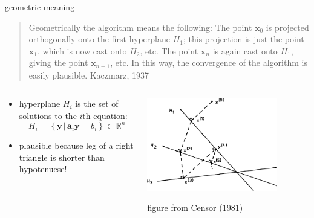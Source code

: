 \documentclass[usepdftitle=false,usenames,dvipsnames]{beamer}
\newcommand{\RR}{\mathbb{R}}
\newcommand{\ba}{\mathbf{a}}
\newcommand{\bx}{\mathbf{x}}
\newcommand{\by}{\mathbf{y}}
\begin{document}
\begin{frame}{geometric meaning}

\begin{quote}
Geometrically the algorithm means the following: The point $\bx_0$ is projected orthogonally onto the first hyperplane $H_1$; this projection is just the point $\bx_1$, which is now cast onto $H_2$, etc. The point $\bx_n$ is again cast onto $H_1$, giving the point $\bx_{n+1}$, etc. In this way, the convergence of the algorithm is easily plausible.  \hspace{18mm} {\normalfont Kaczmarz, 1937}
\end{quote}

\bigskip
\small
\begin{columns}
\begin{column}{0.4\textwidth}
\begin{itemize}
\item hyperplane $H_i$ is the set of solutions to the $i$th equation:
    $$H_i = \left\{\by\,|\,\ba_i \by = b_i\right\} \subset \RR^n$$
\item plausible because leg of a right triangle is shorter than hypotenuese!
\end{itemize}
\end{column}
\begin{column}{0.6\textwidth}
\hfill \includegraphics[width=0.8\textwidth]{figs/kaczmarz-censor.png}

\vfill
\hfill \tiny figure from Censor (1981)
\end{column}
\end{columns}
\end{frame}
\end{document}
